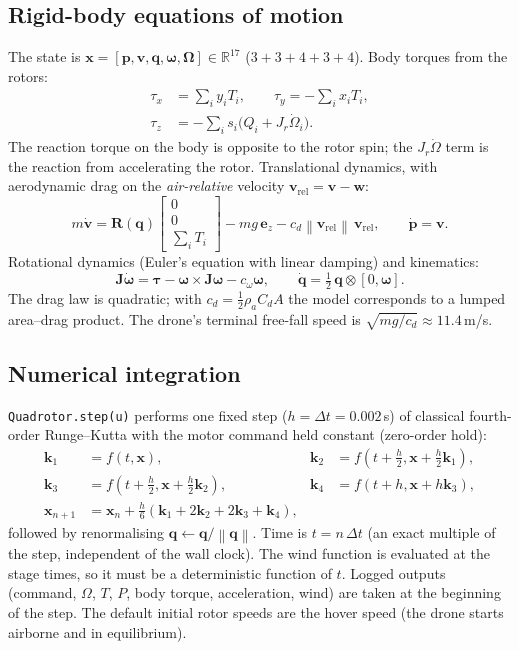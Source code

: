 \documentclass[11pt,a4paper]{article}
\newcommand{\R}{\mathbb{R}}
\newcommand{\vc}[1]{\bm{#1}}
\newcommand{\ez}{\vc{e}_z}
\newcommand{\norm}[1]{\left\lVert #1\right\rVert}
\newcommand{\code}[1]{\texttt{\small #1}}
\begin{document}
\subsection{Rigid-body equations of motion}
The state is $\vc x=[\vc p,\vc v,\vc q,\vc\omega,\vc\Omega]\in\R^{17}$ ($3+3+4+3+4$).
Body torques from the rotors:
\begin{align}
\tau_x&=\sum_i y_iT_i,\qquad \tau_y=-\sum_i x_iT_i,\label{eq:tauxy}\\
\tau_z&=-\sum_i s_i\bigl(Q_i+J_r\dot\Omega_i\bigr).\label{eq:tauz}
\end{align}
The reaction torque on the body is opposite to the rotor spin; the $J_r\dot\Omega$ term is the reaction from accelerating the rotor.
Translational dynamics, with aerodynamic drag on the \emph{air-relative} velocity $\vc v_{\text{rel}}=\vc v-\vc w$:
\begin{equation}
m\dot{\vc v}=\vc R(\vc q)\begin{bmatrix}0\\0\\\sum_iT_i\end{bmatrix}-mg\,\ez-c_d\norm{\vc v_{\text{rel}}}\,\vc v_{\text{rel}},\qquad \dot{\vc p}=\vc v.
\label{eq:trans}
\end{equation}
Rotational dynamics (Euler's equation with linear damping) and kinematics:
\begin{equation}
\vc J\dot{\vc\omega}=\vc\tau-\vc\omega\times\vc J\vc\omega-c_\omega\vc\omega,\qquad
\dot{\vc q}=\tfrac12\,\vc q\otimes[0,\vc\omega].
\label{eq:rot}
\end{equation}
The drag law is quadratic; with $c_d=\tfrac12\rho_a C_dA$ the model corresponds to a lumped area--drag product. The drone's terminal free-fall speed is
$\sqrt{mg/c_d}\approx11.4$\,m/s.

\subsection{Numerical integration}
\code{Quadrotor.step(u)} performs one fixed step ($h=\Delta t=0.002$\,s) of classical fourth-order Runge--Kutta with the motor command held constant (zero-order hold):
\begin{align}
\vc k_1&=f(t,\vc x),& \vc k_2&=f(t+\tfrac h2,\vc x+\tfrac h2\vc k_1),\\
\vc k_3&=f(t+\tfrac h2,\vc x+\tfrac h2\vc k_2),& \vc k_4&=f(t+h,\vc x+h\vc k_3),\\
\vc x_{n+1}&=\vc x_n+\tfrac h6(\vc k_1+2\vc k_2+2\vc k_3+\vc k_4),
\end{align}
followed by renormalising $\vc q\leftarrow\vc q/\norm{\vc q}$. Time is $t=n\,\Delta t$ (an exact multiple of the step, independent of the wall clock). The wind function is evaluated at the stage times, so it must be a deterministic function of $t$. Logged outputs
(command, $\Omega$, $T$, $P$, body torque, acceleration, wind) are taken at the beginning of the step. The default initial rotor speeds are the hover speed (the drone starts airborne and in equilibrium).
\end{document}
